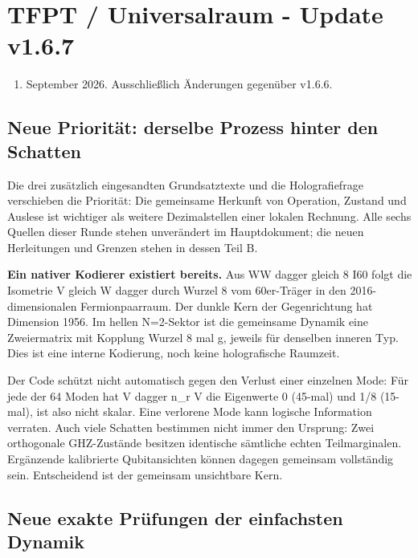 \documentclass[
  ngerman,
  10pt,
  a4paper,
]{article}
\author{}
\date{}
\providecommand{\tightlist}{%
  \setlength{\itemsep}{0pt}\setlength{\parskip}{0pt}}
\begin{document}
\section{TFPT / Universalraum - Update
v1.6.7}\label{tfpt-universalraum---update-v1.6.7}

\begin{enumerate}
\def\labelenumi{\arabic{enumi}.}
\setcounter{enumi}{14}
\tightlist
\item
  September 2026. Ausschließlich Änderungen gegenüber v1.6.6.
\end{enumerate}

\subsection{Neue Priorität: derselbe Prozess hinter den
Schatten}\label{neue-priorituxe4t-derselbe-prozess-hinter-den-schatten}

Die drei zusätzlich eingesandten Grundsatztexte und die Holografiefrage
verschieben die Priorität: Die gemeinsame Herkunft von Operation,
Zustand und Auslese ist wichtiger als weitere Dezimalstellen einer
lokalen Rechnung. Alle sechs Quellen dieser Runde stehen unverändert im
Hauptdokument; die neuen Herleitungen und Grenzen stehen in dessen Teil
B.

\textbf{Ein nativer Kodierer existiert bereits.} Aus WW dagger gleich 8
I60 folgt die Isometrie V gleich W dagger durch Wurzel 8 vom 60er-Träger
in den 2016-dimensionalen Fermionpaarraum. Der dunkle Kern der
Gegenrichtung hat Dimension 1956. Im hellen N=2-Sektor ist die
gemeinsame Dynamik eine Zweiermatrix mit Kopplung Wurzel 8 mal g,
jeweils für denselben inneren Typ. Dies ist eine interne Kodierung, noch
keine holografische Raumzeit.

Der Code schützt nicht automatisch gegen den Verlust einer einzelnen
Mode: Für jede der 64 Moden hat V dagger n\_r V die Eigenwerte 0
(45-mal) und 1/8 (15-mal), ist also nicht skalar. Eine verlorene Mode
kann logische Information verraten. Auch viele Schatten bestimmen nicht
immer den Ursprung: Zwei orthogonale GHZ-Zustände besitzen identische
sämtliche echten Teilmarginalen. Ergänzende kalibrierte Qubitansichten
können dagegen gemeinsam vollständig sein. Entscheidend ist der
gemeinsam unsichtbare Kern.

\subsection{Neue exakte Prüfungen der einfachsten
Dynamik}\label{neue-exakte-pruxfcfungen-der-einfachsten-dynamik}
\end{document}
